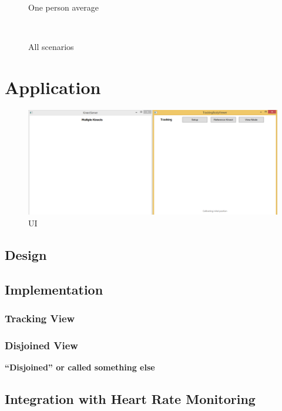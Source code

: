 \documentclass{sigchi}
\begin{document}
\begin{figure}[!h]
  \centering
  
  \caption{One person average}~\label{fig:one_person_average}
\end{figure}

\begin{figure}[!h]
  \centering
  
  \caption{All scenarios}~\label{fig:scenarios}
\end{figure}

\section{Application}

\begin{figure}[!h]
  \centering
  \includegraphics[width=0.9\columnwidth]{ui}
  \caption{UI}
  \label{fig:ui}
\end{figure}

\subsection{Design}

\subsection{Implementation}

\subsubsection{Tracking View}

\subsubsection{Disjoined View}

\textbf{``Disjoined'' or called something else}

\subsection{Integration with Heart Rate Monitoring}
\end{document}
